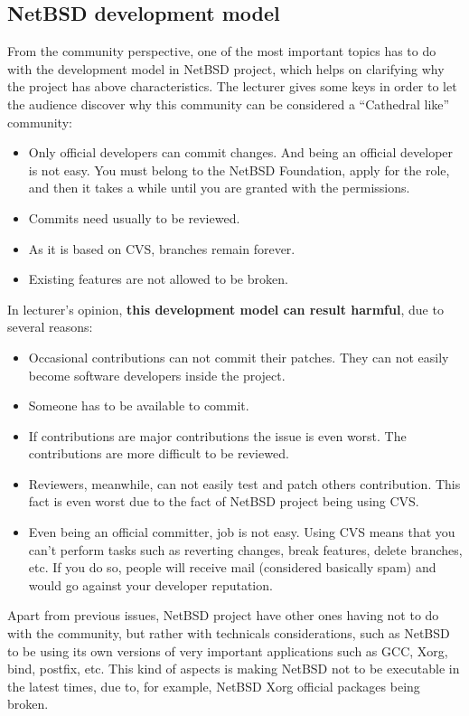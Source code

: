 \documentclass[11pt]{article}
\begin{document}
\subsection{NetBSD development model}
From the community perspective, one of the most important topics has to do with the development model in NetBSD project, which helps on clarifying why the project has above characteristics. The lecturer gives some keys in order to let the audience discover why this community can be considered a ``Cathedral like'' community:
\begin{itemize}\itemsep0pt
\item{Only official developers can commit changes}. And being an official developer is not easy. You must belong to the NetBSD Foundation, apply for the role, and then it takes a while until you are granted with the permissions.
\item{Commits need usually to be reviewed}.
\item{As it is based on CVS, branches remain forever}.
\item{Existing features are not allowed to be broken}.
\end{itemize}
In lecturer's opinion, \textbf{this development model can result harmful}, due to several reasons:
\begin{itemize}
\item{Occasional contributions can not commit their patches}. They can not easily become software developers inside the project.
\item{Someone has to be available to commit}.
\item{If contributions are major contributions the issue is even worst}. The contributions are more difficult to be reviewed.
\item{Reviewers, meanwhile, can not easily test and patch others contribution}. This fact is even worst due to the fact of NetBSD project being using CVS.
\item{Even being an official committer, job is not easy}. Using CVS means that you can't perform tasks such as reverting changes, break features, delete branches, etc. If you do so, people will receive mail (considered basically spam) and would go against your developer reputation.
\end{itemize}
Apart from previous issues, NetBSD project have other ones having not to do with the community, but rather with technicals considerations, such as NetBSD to be using its own versions of very important applications such as GCC, Xorg, bind, postfix, etc. This kind of aspects is making NetBSD not to be executable in the latest times, due to, for example, NetBSD Xorg official packages being broken.
\end{document}
